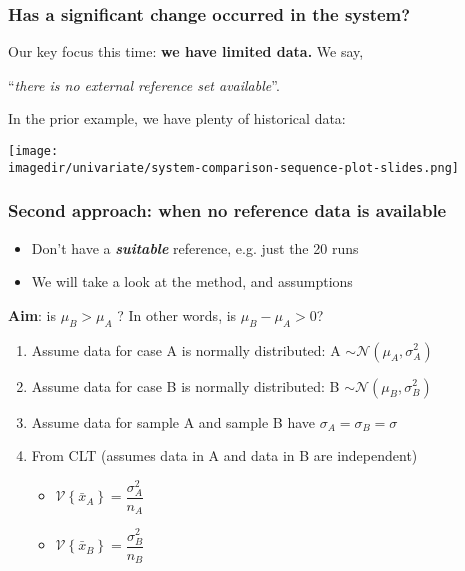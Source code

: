 \begin{frame}\frametitle{Has a significant change occurred in the system?}
	\begin{exampleblock}{}
		Our key focus this time: \textbf{we have limited data.} We say, 
		
		\qquad ``\emph{there is no external reference set available}''.
	\end{exampleblock}
	
	\vspace{24pt}
	In the prior example, we have plenty of historical data:
	
	\texttt{[image: \\imagedir/univariate/system-comparison-sequence-plot-slides.png]}
\end{frame}

\begin{frame}\frametitle{Second approach: when no reference data is available}
	\begin{itemize}
		\item	Don't have a \textbf{\emph{suitable}} reference, e.g. just the 20 runs
		\item	We will take a look at the method, and assumptions
	\end{itemize}

	\textbf{Aim}: is $\mu_B > \mu_A$ ? In other words, is $\mu_B - \mu_A > 0$?
	\begin{enumerate}
		\item	Assume data for case A is normally distributed: A $\sim \mathcal{N}\left(\mu_A, \sigma^2_A\right)$
		
		\item	Assume data for case B is normally distributed: B $\sim \mathcal{N}\left(\mu_B, \sigma^2_B\right)$
		\item	Assume data for sample A and sample B have $\sigma_A = \sigma_B = \sigma$
		\item	From CLT (assumes data in A and data in B are independent)%
			\begin{itemize}
				\item	$\mathcal{V}\left\{\bar{x}_A\right\} = \dfrac{\sigma^2_A}{n_A}$
				\item	$\mathcal{V}\left\{\bar{x}_B\right\} = \dfrac{\sigma^2_B}{n_B}$
			\end{itemize}
	\end{enumerate}
\end{frame}

